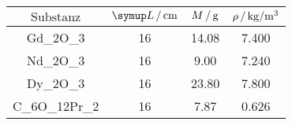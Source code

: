 \begin{table}
  \centering
  \begin{tabular}{c c c c}
    \toprule
    $\text{Substanz}$ & $\su{L}\,/\,\si{\centi\meter}$ & $M\,/\,\si{\gram}$ & $\rho \,/\,\si{\kilo\gram\per\cubic\meter}$ \\
    \midrule
    Gd_2O_3 & 16 & 14.08 & 7.400 \\
    Nd_2O_3 & 16 & 9.00  & 7.240 \\
    Dy_2O_3 & 16 & 23.80 & 7.800 \\
    C_6O_{12}Pr_2 & 16 & 7.87 & 0.626 \\
    \bottomrule
  \end{tabular}
\end{table}
